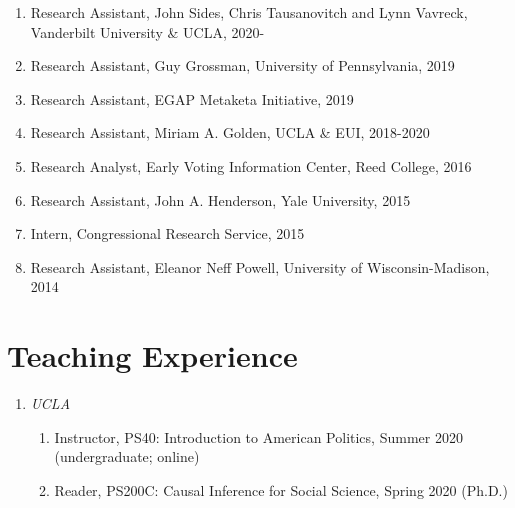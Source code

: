\documentclass[12pt]{article}
\begin{document}
\begin{enumerate}[topsep = 0pt, itemsep = 1ex, partopsep  = 1ex, parsep = 1ex]

	\item[] Research Assistant, John Sides, Chris Tausanovitch and Lynn Vavreck, Vanderbilt University \& UCLA, 2020-

	\item[] Research Assistant, Guy Grossman, University of Pennsylvania, 2019
	
	\item[] Research Assistant, EGAP Metaketa Initiative, 2019
	
	\item[] Research Assistant, Miriam A. Golden, UCLA \& EUI, 2018-2020
	
	\item[] Research Analyst, Early Voting Information Center, Reed College, 2016
	
	\item[] Research Assistant, John A. Henderson, Yale University, 2015
	
	\item[] Intern, Congressional Research Service, 2015
	
	\item[] Research Assistant, Eleanor Neff Powell, University of Wisconsin-Madison, 2014
	
\end{enumerate}

\section*{Teaching Experience}

\begin{enumerate}[topsep = 0pt, itemsep = -1ex, partopsep  = 1ex, parsep = 1ex]
	
	\item[] \textit{UCLA}
	
	\begin{enumerate}[topsep = 0pt, itemsep = -1ex, partopsep = -1ex, parsep = 1ex]
		
		\item[] Instructor, PS40: Introduction to American Politics, Summer 2020 (undergraduate; online)
		\item[] Reader, PS200C: Causal Inference for Social Science, Spring 2020 (Ph.D.)
		
	\end{enumerate}

\end{enumerate}
\end{document}
